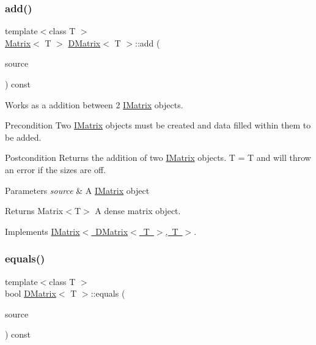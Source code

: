 \subsubsection{\texorpdfstring{add()}{add()}\hspace{0.1cm}{\footnotesize\ttfamily [6/6]}}
{\footnotesize\ttfamily template$<$class T $>$ \\
\mbox{\hyperlink{class_matrix}{Matrix}}$<$ T $>$ \mbox{\hyperlink{class_d_matrix}{D\+Matrix}}$<$ T $>$\+::add (\begin{DoxyParamCaption}\item[{const \mbox{\hyperlink{class_i_matrix}{I\+Matrix}}$<$ \mbox{\hyperlink{class_d_matrix}{D\+Matrix}}$<$ T $>$, T $>$ \&}]{source }\end{DoxyParamCaption}) const\hspace{0.3cm}{\ttfamily [virtual]}}



Works as a addition between 2 \mbox{\hyperlink{class_i_matrix}{I\+Matrix}} objects. 

\begin{DoxyPrecond}{Precondition}
Two \mbox{\hyperlink{class_i_matrix}{I\+Matrix}} objects must be created and data filled within them to be added. 
\end{DoxyPrecond}
\begin{DoxyPostcond}{Postcondition}
Returns the addition of two \mbox{\hyperlink{class_i_matrix}{I\+Matrix}} objects. T = T and will throw an error if the sizes are off.
\end{DoxyPostcond}

\begin{DoxyParams}{Parameters}
{\em source} & A \mbox{\hyperlink{class_i_matrix}{I\+Matrix}} object \\
\hline
\end{DoxyParams}
\begin{DoxyReturn}{Returns}
Matrix$<$\+T$>$ A dense matrix object. 
\end{DoxyReturn}


Implements \mbox{\hyperlink{class_i_matrix_a661dc43bb607b98c28414cdd49bc64f7}{I\+Matrix$<$ D\+Matrix$<$ T $>$, T $>$}}.

\mbox{\label{class_d_matrix_a7756fa7a5bff4efa1c65a1e0b66a9af7}} 
\subsubsection{\texorpdfstring{equals()}{equals()}\hspace{0.1cm}{\footnotesize\ttfamily [1/6]}}
{\footnotesize\ttfamily template$<$class T $>$ \\
bool \mbox{\hyperlink{class_d_matrix}{D\+Matrix}}$<$ T $>$\+::equals (\begin{DoxyParamCaption}\item[{const \mbox{\hyperlink{class_i_matrix}{I\+Matrix}}$<$ \mbox{\hyperlink{class_matrix}{Matrix}}$<$ T $>$, T $>$ \&}]{source }\end{DoxyParamCaption}) const}



